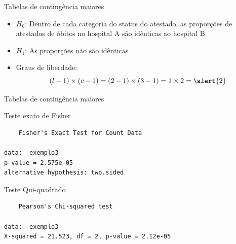 \documentclass{beamer}
\begin{document}
\begin{frame}{\scriptsize Tabelas de contingência maiores}
  \begin{itemize}
    \footnotesize
  \item $H_0$: Dentro de cada categoria do status do atestado, as
    proporções de atestados de óbitos no hospital A são idênticas ao
    hospital B.
  \item $H_1$: As proporções não são idênticas
  \item Graus de liberdade:
    \begin{displaymath}
      (l -1)\times (c-1) = (2-1) \times (3-1)
      = 1 \times 2 = \alert{2}
    \end{displaymath}
  \end{itemize}
\end{frame}

\begin{frame}[fragile]{\scriptsize Tabelas de contingência maiores}
  \begin{exampleblock}{Teste exato de Fisher}
    \scriptsize
\begin{verbatim}
	Fisher's Exact Test for Count Data

data:  exemplo3
p-value = 2.575e-05
alternative hypothesis: two.sided
\end{verbatim}

  \end{exampleblock}
  \begin{exampleblock}{Teste Qui-quadrado}
    \scriptsize
\begin{verbatim}
	Pearson's Chi-squared test

data:  exemplo3
X-squared = 21.523, df = 2, p-value = 2.12e-05
\end{verbatim}
  \end{exampleblock}
\end{frame}


\end{document}
